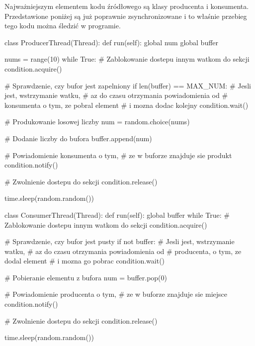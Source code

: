 \documentclass{article}
\begin{document}
Najważniejszym elementem kodu źródłowego są klasy producenta i konsumenta. Przedstawione poniżej są już poprawnie zsynchronizowane i to właśnie przebieg tego kodu można śledzić w programie.

\begin{python}
class ProducerThread(Thread):
    def run(self):
        global num
        global buffer
        
        nums = range(10)
        while True:
        	# Zablokowanie dostepu innym watkom do sekcji
            condition.acquire() 
            
            # Sprawdzenie, czy bufor jest zapelniony          
            if len(buffer) == MAX_NUM:
            	# Jesli jest, wstrzymanie watku, 
            	# az do czasu otrzymania powiadomienia od 
            	# konsumenta o tym, ze pobral element 
            	# i mozna dodac kolejny 
                condition.wait() 
            
            # Produkowanie losowej liczby
            num = random.choice(nums) 
            
            # Dodanie liczby do bufora
            buffer.append(num) 
            
            # Powiadomienie konsumenta o tym, 
            # ze w buforze znajduje sie produkt
            condition.notify() 
                              
                              
            # Zwolnienie dostepu do sekcji
            condition.release() 
            
            time.sleep(random.random())

\end{python}


\newpage

\begin{python}
class ConsumerThread(Thread):
    def run(self):
        global buffer
        while True:     
        	# Zablokowanie dostepu innym watkom do sekcji                 
            condition.acquire()
           
		# Sprawdzenie, czy bufor jest pusty
            if not buffer:     
            	# Jesli jest, wstrzymanie watku, 
            	# az do czasu otrzymania powiadomienia od 
            	# producenta, o tym, ze dodal element 
            	# i mozna go pobrac         
                condition.wait()
                              
            # Pobieranie elementu z bufora               
            num = buffer.pop(0)
                       
            # Powiadomienie producenta o tym, 
            # ze w buforze znajduje sie miejsce
            condition.notify()
            
            # Zwolnienie dostepu do sekcji
            condition.release()

            time.sleep(random.random())

\end{python}
\end{document}

